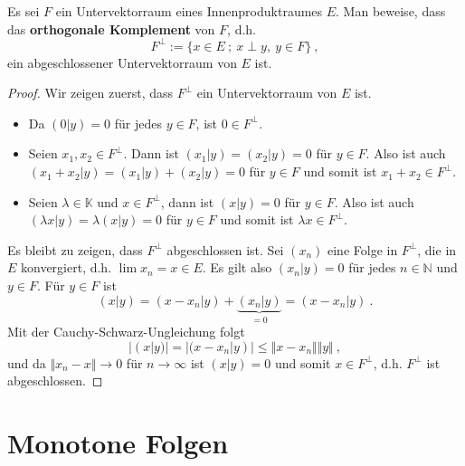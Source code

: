\begin{aufgabe}
	Es sei $F$ ein Untervektorraum eines Innenproduktraumes $E$. Man beweise, dass das 
	\textbf{orthogonale Komplement} von $F$, d.h.
	\[
		F^\perp := \{ x \in E \ ; \ x \perp y, \ y \in F \} \ ,
	\]
	ein abgeschlossener Untervektorraum von $E$ ist.
\end{aufgabe}
\begin{proof}
	Wir zeigen zuerst, dass $F^\perp$ ein Untervektorraum von $E$ ist.
	\begin{itemize}
		\item Da $(0 | y) = 0$ für jedes $y \in F$, ist $0 \in F^\perp$.
		\item Seien $x_1, x_2 \in F^\perp$. Dann ist $(x_1 | y) = (x_2 | y) = 0$ für $y \in F$.
			Also ist auch $(x_1 + x_2 | y) = (x_1 | y ) + (x_2 | y) = 0$ für $y \in F$ und somit
			ist $x_1 + x_2 \in F^\perp$.
		\item Seien $\lambda \in \mathbb K$ und $x \in F^\perp$, dann ist 
			$(x | y) = 0$ für $y \in F$. Also ist auch $(\lambda x | y) = \lambda (x | y) = 0$
			für $y \in F$ und somit ist $\lambda x \in F^\perp$.
	\end{itemize}
	Es bleibt zu zeigen, dass $F^\perp$ abgeschlossen ist. Sei $(x_n)$ eine Folge in $F^\perp$, 
	die in $E$ konvergiert, d.h. $\lim x_n = x \in E$. 
	Es gilt also $(x_n | y) = 0$ für jedes $n \in \mathbb N$ und $y \in F$.
	Für $y \in F$ ist 
	\[
		(x | y) = (x - x_n | y ) + \underbrace{ (x_n | y)}_{=0} = (x - x_n | y) \ .
	\]
	Mit der Cauchy-Schwarz-Ungleichung folgt
	\[
		| (x | y) | = | (x-x_n | y) | \leq \Vert x - x_n \Vert \Vert y \Vert \ ,
	\]
	und da $\Vert x_n - x \Vert \to 0$ für $n \to \infty$ ist $(x|y)=0$ und somit
	$x \in F^\perp$, d.h. $F^\perp$ ist abgeschlossen.
\end{proof}



\section{Monotone Folgen}

